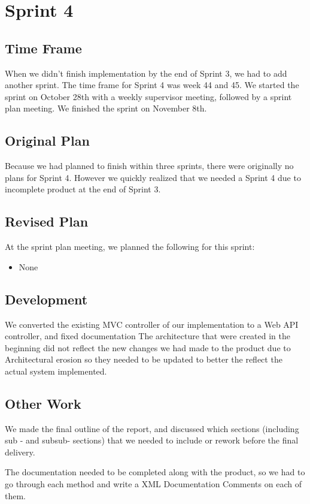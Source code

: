 \chapter{Sprint 4}

\section{Time Frame}
When we didn't finish implementation by the end of Sprint 3, we had to add another sprint. The time frame for Sprint 4 was week 44 and 45. We started the sprint on October 28th with a weekly supervisor meeting, followed by a sprint plan meeting. We finished the sprint on November 8th.

\section{Original Plan}
Because we had planned to finish within three sprints, there were originally no plans for Sprint 4. However we quickly realized that we needed a Sprint 4 due to incomplete product at the end of Sprint 3.

\section{Revised Plan}
At the sprint plan meeting, we planned the following for this sprint:
\begin{itemize}
	\item None
\end{itemize}


\section{Development}
We converted the existing MVC controller of our implementation to a Web API controller, and fixed documentation
The architecture that were created in the beginning did not reflect the new changes we had made to the product due to Architectural erosion so they needed to be updated to better the reflect the actual system implemented.

\section{Other Work}
We made the final outline of the report, and discussed which sections (including sub - and subsub- sections) that we needed to include or rework before the final delivery.

The documentation needed to be completed along with the product, so we had to go through each method and write a XML Documentation Comments on each of them.

